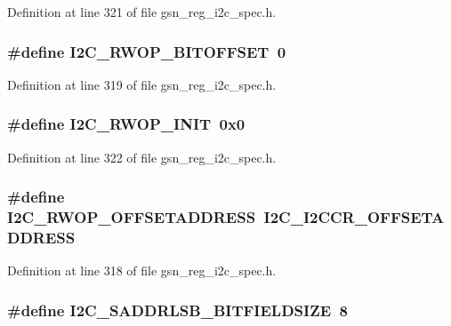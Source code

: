 Definition at line 321 of file gsn\_\-reg\_\-i2c\_\-spec.h.

\hypertarget{a00558_a1ca93b2ce3091343a23a8bf786c30e3f}{
\subsubsection[{I2C\_\-RWOP\_\-BITOFFSET}]{\setlength{\rightskip}{0pt plus 5cm}\#define I2C\_\-RWOP\_\-BITOFFSET~0}}
\label{a00558_a1ca93b2ce3091343a23a8bf786c30e3f}


Definition at line 319 of file gsn\_\-reg\_\-i2c\_\-spec.h.

\hypertarget{a00558_a9438958b1b121391484e9cec6dfa0a8b}{
\subsubsection[{I2C\_\-RWOP\_\-INIT}]{\setlength{\rightskip}{0pt plus 5cm}\#define I2C\_\-RWOP\_\-INIT~0x0}}
\label{a00558_a9438958b1b121391484e9cec6dfa0a8b}


Definition at line 322 of file gsn\_\-reg\_\-i2c\_\-spec.h.

\hypertarget{a00558_afdbb6692c323d59cfc35da6aae8dbc47}{
\subsubsection[{I2C\_\-RWOP\_\-OFFSETADDRESS}]{\setlength{\rightskip}{0pt plus 5cm}\#define I2C\_\-RWOP\_\-OFFSETADDRESS~I2C\_\-I2CCR\_\-OFFSETADDRESS}}
\label{a00558_afdbb6692c323d59cfc35da6aae8dbc47}


Definition at line 318 of file gsn\_\-reg\_\-i2c\_\-spec.h.

\hypertarget{a00558_a2d6dba1eb00fbf75207498c4c10f5630}{
\subsubsection[{I2C\_\-SADDRLSB\_\-BITFIELDSIZE}]{\setlength{\rightskip}{0pt plus 5cm}\#define I2C\_\-SADDRLSB\_\-BITFIELDSIZE~8}}
\label{a00558_a2d6dba1eb00fbf75207498c4c10f5630}


